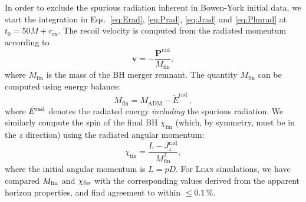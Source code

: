\documentclass[floats,floatfix,showpacs,amssymb,prd,twocolumn,superscriptaddress,nofootinbib,nolongbibliography,reprint]{revtex4-2}
\newcommand{\us}[1]{{\textcolor{teal}{\sf{[US: #1]}} }}
\newcommand{\rad}{\mathrm{rad}}
\begin{document}
In order to exclude the spurious radiation inherent in Bowen-York initial 
data, we start the integration in Eqs.~\eqref{eq:Erad}, \eqref{eq:Prad}, 
\eqref{eq:Jrad} and \eqref{eq:Plmrad} at $t_0 = 50M + r_{\mathrm{ex}}$. The 
recoil velocity is computed from the radiated momentum according to 
%
\begin{equation}
    \mathbf{v}=-\frac{\mathbf{P}^{\rad}}{M_{\mathrm{fin}}},
\end{equation}
%
where $M_{\mathrm{fin}}$ is the mass of the BH merger remnant. The 
quantity $M_{\mathrm{fin}}$ can be computed using energy balance:
\begin{equation}
    M_{\mathrm{fin}} = M_{\mathrm{ADM}} - \tilde{E}^{\rad}\,,
\end{equation}
where $\tilde{E}^{\rm rad}$ denotes the radiated energy
{\it including} the spurious radiation.
We similarly compute the spin of the final BH $\chi_{\mathrm{fin}}$ (which,
by symmetry, must be in the $z$ direction) using the radiated angular 
momentum:
\begin{equation}
    \chi_{\mathrm{fin}} = \frac{L-J^{\rad}_z}{M_{\mathrm{fin}}^2},
\end{equation}
where the initial angular momentum is $L=pD$. For \textsc{Lean} simulations, 
we have compared $M_{\rm fin}$ and $\chi_{\rm fin}$ with the
corresponding values derived from the apparent horizon properties,
and find agreement to within $\leq 0.1\,\%$.


\end{document}
